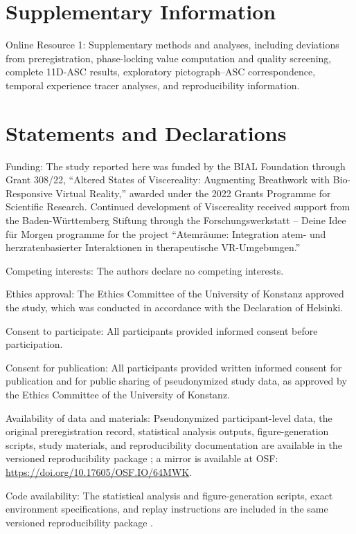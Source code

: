 \documentclass[pdflatex,sn-basic,lineno]{sn-jnl}
\begin{document}
\section*{Supplementary Information}
Online Resource 1: Supplementary methods and analyses, including deviations from preregistration, phase-locking value computation and quality screening, complete 11D-ASC results, exploratory pictograph--ASC correspondence, temporal experience tracer analyses, and reproducibility information.

\section*{Statements and Declarations}
Funding: The study reported here was funded by the BIAL Foundation through Grant 308/22, ``Altered States of Viscereality: Augmenting Breathwork with Bio-Responsive Virtual Reality,'' awarded under the 2022 Grants Programme for Scientific Research. Continued development of Viscereality received support from the Baden-W\"urttemberg Stiftung through the Forschungswerkstatt -- Deine Idee f\"ur Morgen programme for the project ``Atemr\"aume: Integration atem- und herzratenbasierter Interaktionen in therapeutische VR-Umgebungen.''

Competing interests: The authors declare no competing interests.

Ethics approval: The Ethics Committee of the University of Konstanz approved the study, which was conducted in accordance with the Declaration of Helsinki.

Consent to participate: All participants provided informed consent before participation.

Consent for publication: All participants provided written informed consent for publication and for public sharing of pseudonymized study data, as approved by the Ethics Committee of the University of Konstanz.

Availability of data and materials: Pseudonymized participant-level data, the original preregistration record, statistical analysis outputs, figure-generation scripts, study materials, and reproducibility documentation are available in the versioned reproducibility package \citep{Fejer2026ViscerealityData}; a mirror is available at OSF: \url{https://doi.org/10.17605/OSF.IO/64MWK}.

Code availability: The statistical analysis and figure-generation scripts, exact environment specifications, and replay instructions are included in the same versioned reproducibility package \citep{Fejer2026ViscerealityData}.
\end{document}
